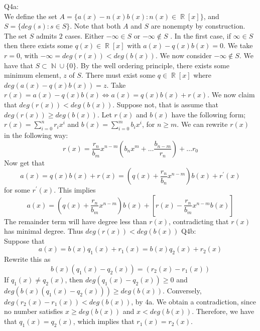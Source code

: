 \documentclass[letterpaper]{article}
\DeclareMathOperator{\R}{\mathbb{R}}
\DeclareMathOperator{\N}{\mathbb{N}}
\begin{document}
\noindent Q4a: \\ 
We define the set $A = \{a(x)-n(x)b(x) : n(x)\in \R[x]  \}$, and $S = \{deg (s) : s\in S \}$. Note that both $A$ and $S$ are nonempty by construction. The set $S$ admits $2$ cases. Either $-\infty \in S$ or $-\infty \notin S$ . 
In the first case, if $\infty \in S$ then there exists some $q(x)\in \R[x]$ with $a(x)-q(x)b(x)=0$. We take $r=0$, with $-\infty = deg(r(x)) < deg(b(x))$. 
We now consider $-\infty \notin S$. We have that $S \subset \N \cup \{0\}$. By the well ordering principle, there exists some minimum element, $z$ of $S$. There must exist some $q\in \R[x]$ where $deg(a(x)-q(x)b(x)) = z$.  
Take $r(x)= a(x)-q(x)b(x) \iff a(x) = q(x)b(x) +r(x)$. We now claim that $deg(r(x)) < deg(b(x))$. Suppose not, that is assume that $deg(r(x)) \geq deg(b(x))$. Let $r(x)$ and $b(x)$ have the following form; $r(x) = \sum_{i=0}^n r_ix^i$ and $b(x) = \sum_{i=0}^m b_i x^i$, for $n\geq m$. 
We can rewrite $r(x)$ in the following way: $$r(x) = \frac{r_n}{b_m}x^{n-m}(b_n x^m + \dots \frac{b_{n-m}}{r_n}) + \dots r_0$$
Now get that $$a(x) = q(x)b(x)+r(x) = (q(x)+\frac{r_n}{b_n}x^{n-m})b(x) + r^\prime(x)$$ for some $r^\prime(x)$. 
This implies $$a(x) = (q(x)+\frac{r_n}{b_m}x^{n-m})b(x) + [r(x)-\frac{r_n}{b_m}x^{n-m}b(x)]$$
The remainder term will have degree less than $r(x)$, contradicting that $r(x)$ has minimal degree. Thus $deg(r(x))< deg(b(x))$
\newline Q4b: \\ Suppose that $$a(x)= b(x)q_1(x)+r_1(x)= b(x)q_2(x)+r_2(x)$$ Rewrite this as $$b(x)(q_1(x)-q_2(x)) = (r_2(x)-r_1(x))$$ If $q_1(x)\neq q_2(x)$, then $deg(q_1(x)-q_2(x)) \geq 0$ and $deg(b(x)(q_1(x)-q_2(x))) \geq deg(b(x))$. Conversely, $deg(r_2(x)-r_1(x))<  deg(b(x))$, by 4a. We obtain a contradiction, since no number satisfies $x\geq deg(b(x))$ and $x< deg(b(x))$. 
Therefore, we have that $q_1(x)=q_2(x)$, which implies that $r_1(x)=r_2(x)$. 
\end{document}
